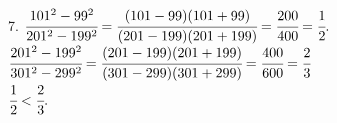 7. $\cfrac{101^2-99^2}{201^2-199^2}=\cfrac{(101-99)(101+99)}{(201-199)(201+199)}=\cfrac{200}{400}=\cfrac{1}{2}.$\\
$\cfrac{201^2-199^2}{301^2-299^2}=\cfrac{(201-199)(201+199)}{(301-299)(301+299)}=\cfrac{400}{600}=\cfrac{2}{3}$\\
$\cfrac{1}{2}<\cfrac{2}{3}.$\\

